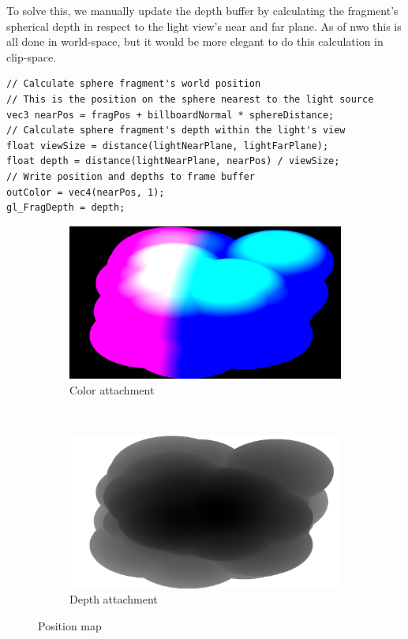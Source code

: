 To solve this, we manually update the depth buffer by calculating the fragment's spherical depth in respect to the light view's near and far plane. As of nwo this is all done in world-space, but it would be more elegant to do this calculation in clip-space.
\begin{lstlisting}[caption={first\_voxelize.glsl, 60}]
// Calculate sphere fragment's world position 
// This is the position on the sphere nearest to the light source
vec3 nearPos = fragPos + billboardNormal * sphereDistance;
// Calculate sphere fragment's depth within the light's view
float viewSize = distance(lightNearPlane, lightFarPlane);
float depth = distance(lightNearPlane, nearPos) / viewSize;
// Write position and depths to frame buffer
outColor = vec4(nearPos, 1);
gl_FragDepth = depth;
\end{lstlisting}

\begin{figure}[t]
\centering
	\begin{subfigure}[t]{0.48\textwidth}
	\includegraphics[width=\textwidth]{../res/positionmapcolor.png}
	\caption{Color attachment}
	\end{subfigure}
	~
	\begin{subfigure}[t]{0.48\textwidth}
	\includegraphics[width=\textwidth]{../res/positionmapdepth.png}
	\caption{Depth attachment}
	\end{subfigure}
\caption{Position map}
\end{figure}


